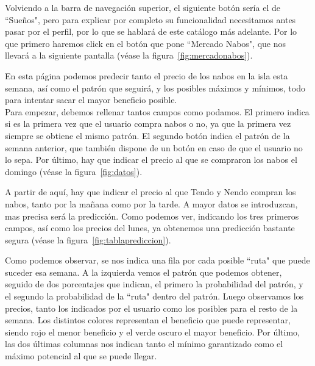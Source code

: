 \clearpage

Volviendo a la barra de navegación superior, el siguiente botón sería el de ``Sueños", pero para explicar por completo su funcionalidad necesitamos antes pasar por el perfil, por lo que se hablará de este catálogo más adelante. Por lo que primero haremos click en el botón que pone ``Mercado Nabos", que nos llevará a la siguiente pantalla {(v\'ease la figura~\ref{fig:mercadonabos})}.\\


En esta página podemos predecir tanto el precio de los nabos en la isla esta semana, así como el patrón que seguirá, y los posibles máximos y mínimos, todo para intentar sacar el mayor beneficio posible.\\

Para empezar, debemos rellenar tantos campos como podamos. El primero indica si es la primera vez que el usuario compra nabos o no, ya que la primera vez siempre se obtiene el mismo patrón.
El segundo botón indica el patrón de la semana anterior, que también dispone de un botón en caso de que el usuario no lo sepa. Por último, hay que indicar el precio al que se compraron los nabos el domingo {(v\'ease la figura~\ref{fig:datos})}.\\


\clearpage

A partir de aquí, hay que indicar el precio al que Tendo y Nendo compran los nabos, tanto por la mañana como por la tarde. A mayor datos se introduzcan, mas precisa será la predicción. Como podemos ver, indicando los tres primeros campos, así como los precios del lunes, ya obtenemos una predicción bastante segura {(v\'ease la figura~\ref{fig:tablaprediccion})}.\\


Como podemos observar, se nos indica una fila por cada posible ``ruta" que puede suceder esa semana. A la izquierda vemos el patrón que podemos obtener, seguido de dos porcentajes que indican, el primero la probabilidad del patrón, y el segundo la probabilidad de la ``ruta" dentro del patrón. Luego observamos los precios, tanto los indicados por el usuario como los posibles para el resto de la semana. Los distintos colores representan el beneficio que puede representar, siendo rojo el menor beneficio y el verde oscuro el mayor beneficio. Por último, las dos últimas columnas nos indican tanto el mínimo garantizado como el máximo potencial al que se puede llegar.\\

